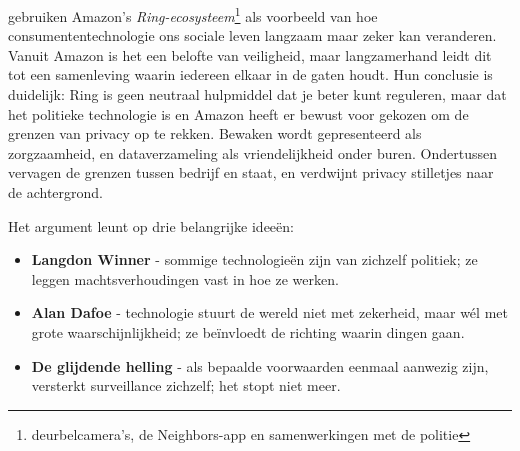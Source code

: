 \documentclass[nonacm, sigconf]{acmart}
\begin{document}
    \parencite{selinger2022amazon} gebruiken Amazon's \textit{Ring-ecosysteem}\footnote{deurbelcamera's, de Neighbors-app en samenwerkingen met de politie} als voorbeeld van hoe consumententechnologie ons sociale leven langzaam maar zeker kan veranderen.
    Vanuit Amazon is het een belofte van veiligheid, maar langzamerhand leidt dit tot een samenleving waarin iedereen elkaar in de gaten houdt.
    Hun conclusie is duidelijk: Ring is geen neutraal hulpmiddel dat je beter kunt reguleren, maar dat het politieke technologie is en Amazon heeft er bewust voor gekozen om de grenzen van privacy op te rekken.
    Bewaken wordt gepresenteerd als zorgzaamheid, en dataverzameling als vriendelijkheid onder buren.
    Ondertussen vervagen de grenzen tussen bedrijf en staat, en verdwijnt privacy stilletjes naar de achtergrond.

    \vertspace

    \noindent Het argument leunt op drie belangrijke ideeën:
    \begin{itemize}
        \item \textbf{Langdon Winner} - sommige technologieën zijn van zichzelf politiek; ze leggen machtsverhoudingen vast in hoe ze werken.
        \item \textbf{Alan Dafoe} - technologie stuurt de wereld niet met zekerheid, maar wél met grote waarschijnlijkheid; ze beïnvloedt de richting waarin dingen gaan.
        \item \textbf{De glijdende helling} - als bepaalde voorwaarden eenmaal aanwezig zijn, versterkt surveillance zichzelf; het stopt niet meer.
    \end{itemize}

    \vertspace

\end{document}
